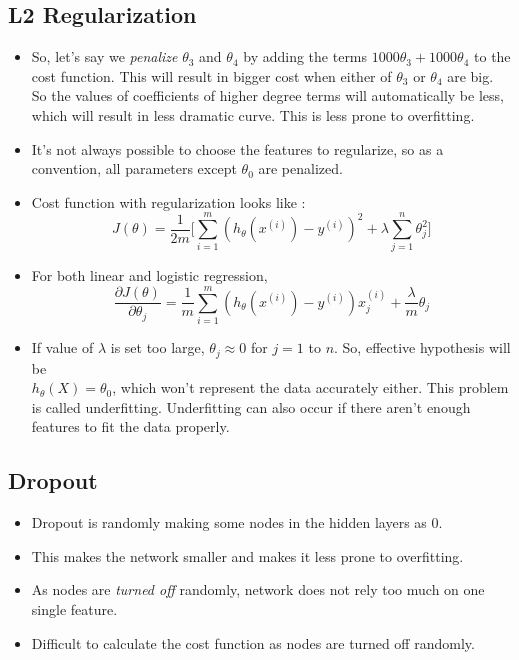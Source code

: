 \documentclass{article}
\begin{document}
\subsection{L2 Regularization}
\begin{itemize}
	\item So, let's say we \emph{penalize} $\theta_3$ and $\theta_4$ by adding the terms $1000\theta_3 + 1000\theta_4$ to the cost function. This will result in bigger cost when either of $\theta_3$ or $\theta_4$ are big. So the values of coefficients of higher degree terms will automatically be less, which will result in less dramatic curve. This is less prone to overfitting.
	\item It's not always possible to choose the features to regularize, so as a convention, all parameters except $\theta_0$ are penalized.
	\item Cost function with regularization looks like :
	$$J(\theta)= \frac{1}{2m} \Bigg[\sum_{i=1}^{m} (h_\theta(x^{(i)})-y^{(i)})^2 + \lambda \sum_{j=1}^n \theta_j^2 \Bigg]$$
	\item For both linear and logistic regression,
	$$\frac{\partial J(\theta)}{\partial \theta_j}=\frac{1}{m} \sum_{i=1}^{m} (h_\theta(x^{(i)})-y^{(i)})x_j^{(i)} + \frac{\lambda}{m} \theta_j$$
	\item If value of $\lambda$ is set too large, $\theta_j\approx 0$ for $j=1$ to $n$. So, effective hypothesis will be\\ $h_\theta(X)=\theta_0$, which won't represent the data accurately either. This problem is called underfitting. Underfitting can also occur if there aren't enough features to fit the data properly.
\end{itemize}
\subsection{Dropout}
\begin{itemize}
	\item Dropout is randomly making some nodes in the hidden layers as 0.
	\item This makes the network smaller and makes it less prone to overfitting.
	\item As nodes are \emph{turned off} randomly, network does not rely too much on one single feature.
	\item Difficult to calculate the cost function as nodes are turned off randomly.
\end{itemize}
\end{document}
